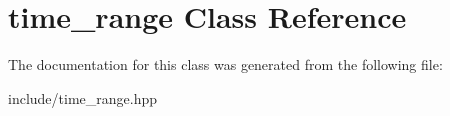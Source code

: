 \hypertarget{classtime__range}{}\section{time\+\_\+range Class Reference}
\label{classtime__range}


The documentation for this class was generated from the following file\+:\begin{DoxyCompactItemize}
\item 
include/time\+\_\+range.\+hpp\end{DoxyCompactItemize}
